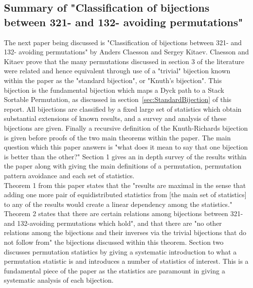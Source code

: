 \documentclass[12pt]{article}
\begin{document}
\subsection{Summary of "Classification of bijections between 321- and 132- avoiding permutations"}
The next paper being discussed is "Classification of bijections between 321- and 132- avoiding permutations" by Anders Claesson and Sergey Kitaev. \cite{Clae01} Claesson and Kitaev prove that the many permutations discussed in section 3 of the literature were related and hence equivalent through use of a "trivial" bijection known within the paper as the "standard bijection", or "Knuth's bijection". This bijection is the fundamental bijection which maps a Dyck path to a Stack Sortable Permutation, as discussed in section~\ref{sec:StandardBijection} of this report. All bijections are classified by a fixed large set of statistics which obtain substantial extensions of known results, and a survey and analysis of these bijections are given. Finally a recursive definition of the Knuth-Richards bijection is given before proofs of the two main theorems within the paper. The main question which this paper answers is "what does it mean to say that one bijection is better than the other?" Section 1 gives an in depth survey of the results within the paper along with giving the main definitions of a permutation, permutation pattern avoidance and each set of statistics.\\
Theorem 1 from this paper states that the "results are maximal in the sense that adding one more pair of equidistributed statistics from [the main set of statistics] to any of the results would create a linear dependency among the statistics." Theorem 2 states that there are certain relations among bijections between 321- and 132-avoiding permutations which hold", and that there are "no other relations among the bijections and their inverses via the trivial bijections that do not follow from" the bijections discussed within this theorem. Section two discusses permutation statistics by giving a systematic introduction to what a permutation statistic is and introduces a number of statistics of interest. This is a fundamental piece of the paper as the statistics are paramount in giving a systematic analysis of each bijection.\\
\end{document}
